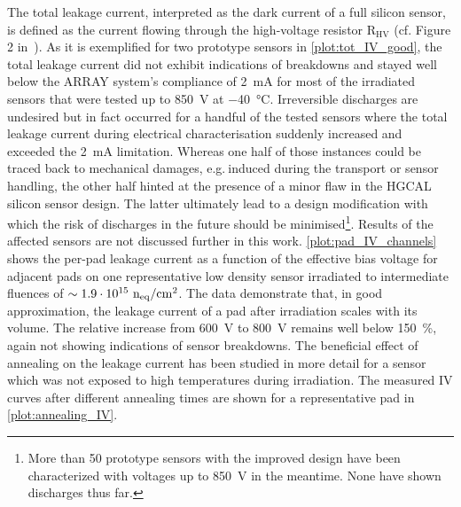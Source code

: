 The total leakage current, interpreted as the dark current of a full silicon sensor, is defined as the current flowing through the high-voltage resistor R$_\text{HV}$ (cf. Figure 2 in~\cite{pitters:array2019}).
As it is exemplified for two prototype sensors in \ref{plot:tot_IV_good}, the total leakage current did not exhibit indications of breakdowns and stayed well below the ARRAY system's compliance of \SI{2}{\milli\ampere} for most of the irradiated sensors that were tested up to \SI{850}{\volt} at \SI{-40}{\celsius}.
Irreversible discharges are undesired but in fact occurred for a handful of the tested sensors where the total leakage current during electrical characterisation suddenly increased and exceeded the \SI{2}{\milli\ampere} limitation.
Whereas one half of those instances could be traced back to mechanical damages, e.g.$~$induced during the transport or sensor handling, the other half hinted at the presence of a minor flaw in the HGCAL silicon sensor design.
The latter ultimately lead to a design modification with which the risk of discharges in the future should be minimised\footnote{More than 50 prototype sensors with the improved design have been characterized with voltages up to \SI{850}{\volt} in the meantime. None have shown discharges thus far.}.
Results of the affected sensors are not discussed further in this work.
\ref{plot:pad_IV_channels} shows the per-pad leakage current as a function of the effective bias voltage for adjacent pads on one representative low density sensor irradiated to intermediate fluences of $\sim 1.9\cdot 10^{15}~\mathrm{n_{eq}}/\mathrm{cm}^{2}$.
The data demonstrate that, in good approximation, the leakage current of a pad after irradiation scales with its volume.
The relative increase from \SI{600}{\volt} to \SI{800}{\volt} remains well below \SI{150}{\percent}, again not showing indications of sensor breakdowns.
The beneficial effect of annealing on the leakage current has been studied in more detail for a sensor which was not exposed to high temperatures during irradiation.
The measured IV curves after different annealing times are shown for a representative pad in \ref{plot:annealing_IV}.
